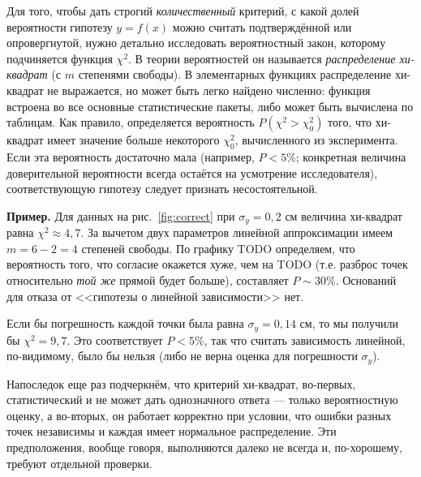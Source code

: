 Для того, чтобы дать строгий \emph{количественный}
критерий, с какой долей вероятности гипотезу $y=f\!\left(x\right)$
можно считать подтверждённой или опровергнутой, нужно детально исследовать
вероятностный закон, которому подчиняется функция $\chi^{2}$. В теории
вероятностей он называется \emph{распределение хи-квадрат}
(с $m$ степенями свободы). В элементарных функциях распределение
хи-квадрат не выражается, но может быть легко найдено численно: функция
встроена во все основные статистические пакеты, либо может быть вычислена
по таблицам. Как правило, определяется вероятность 
$P\left(\chi^{2}>\chi_{0}^{2}\right)$
того, что хи-квадрат имеет значение больше некоторого $\chi_{0}^{2}$,
вычисленного из эксперимента. Если эта вероятность достаточно мала
(например, $P<5\%$; конкретная величина доверительной вероятности
всегда остаётся на усмотрение исследователя), соответствующую гипотезу
следует признать несостоятельной.

{\footnotesize
\textbf{Пример.} Для данных на рис.~\ref{fig:correct}
при $\sigma_{y}=0{,}2$ см величина хи-квадрат равна $\chi^{2}\approx4{,}7$.
За вычетом двух параметров линейной аппроксимации имеем $m=6-2=4$
степеней свободы. По графику TODO определяем, что вероятность того,
что согласие окажется хуже, чем на TODO (т.е. разброс точек относительно
\emph{той же} прямой будет больше),
составляет $P\sim30\%$. Оснований для отказа от <<гипотезы
о линейной зависимости>> нет.

Если бы погрешность каждой точки была равна $\sigma_{y}=0{,}14$
см, то мы получили бы $\chi^{2}=9{,}7$. Это соответствует $P<5\%$,
так что считать зависимость линейной, по-видимому, было бы нельзя
(либо не верна оценка для погрешности $\sigma_{y}$).\par
}%

Напоследок еще раз подчеркнём, что критерий хи-квадрат, во-первых,
статистический и не может дать однозначного ответа --- только
вероятностную оценку, а во-вторых, он работает корректно при условии,
что ошибки разных точек независимы и каждая имеет нормальное распределение.
Эти предположения, вообще говоря, выполняются далеко не всегда и,
по-хорошему, требуют отдельной проверки.
